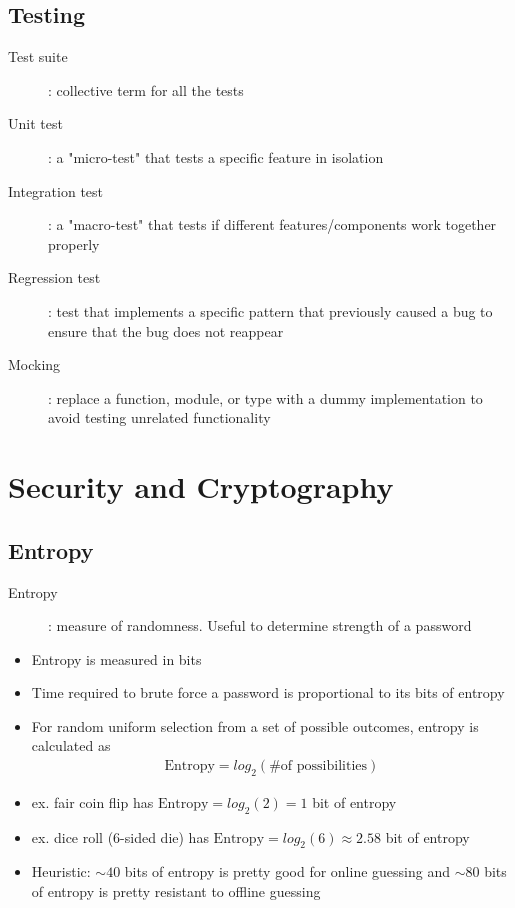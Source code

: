 \documentclass[letterpaper,12pt]{article}
\begin{document}
\subsection{Testing}
\begin{description}
 \item[Test suite]: collective term for all the tests
 \item[Unit test]: a "micro-test" that tests a specific feature in isolation
 \item[Integration test]: a "macro-test" that tests if different features/components work together properly
 \item[Regression test]: test that implements a specific pattern that previously caused a bug to ensure that the bug does not reappear
 \item[Mocking]: replace a function, module, or type with a dummy implementation to avoid testing unrelated functionality
\end{description}

\section{Security and Cryptography}

\subsection{Entropy}
\begin{description}
 \item[Entropy]: measure of randomness. Useful to determine strength of a password
\end{description}

\begin{itemize}
 \item Entropy is measured in bits
 \item Time required to brute force a password is proportional to its bits of entropy
 \item For random uniform selection from a set of possible outcomes, entropy is calculated as
       \begin{align}
        \text{Entropy} = log_2(\text{\# of possibilities})
       \end{align}
 \item ex. fair coin flip has $\text{Entropy} = log_2(2) = 1$ bit of entropy
 \item ex. dice roll (6-sided die) has $\text{Entropy} = log_2(6) \approx 2.58$ bit of entropy
 \item Heuristic: $\sim 40$ bits of entropy is pretty good for online guessing and $\sim 80$ bits of entropy is pretty resistant to offline guessing
\end{itemize}
\end{document}
